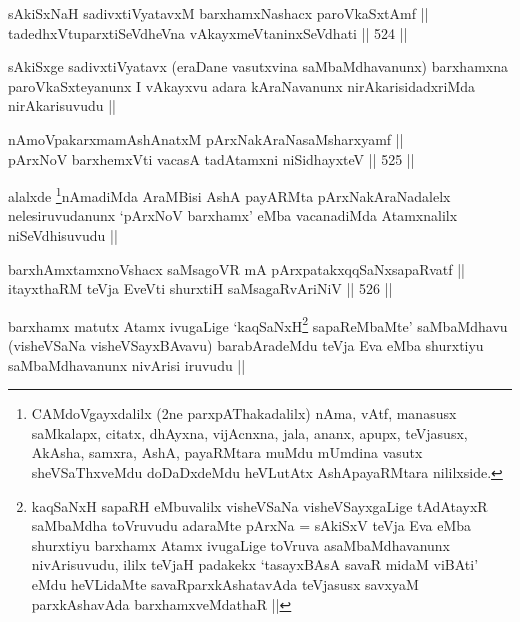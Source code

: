 
\begin{shl}
sAkiSxNaH sadivxtiVyatavxM barxhamxNashacx paroVkaSxtAmf || \\
tadedhxVtuparxtiSeVdheVna vAkayxmeVtaninxSeVdhati ||  524 ||  
\end{shl}

\begin{artha}
sAkiSxge sadivxtiVyatavx (eraDane vasutxvina saMbaMdhavanunx)
barxhamxna paroVkaSxteyanunx I vAkayxvu adara kAraNavanunx
nirAkarisidadxriMda nirAkarisuvudu ||
\end{artha}

\begin{shl}
nAmoVpakarxmamAshAnatxM pArxNakAraNasaMsharxyamf || \\
pArxNoV barxhemxVti vacasA tadAtamxni niSidhayxteV ||  525 ||  
\end{shl}

\begin{artha}
alalxde \footnote{CAMdoVgayxdalilx (2ne parxpAThakadalilx) nAma, vAtf,
  manasusx saMkalapx, citatx, dhAyxna, vijAcnxna, jala, ananx, apupx,
  teVjasusx, AkAsha, samxra, AshA, payaRMtara muMdu mUmdina vasutx
  sheVSaThxveMdu doDaDxdeMdu heVLutAtx AshApayaRMtara nililxside.}nAmadiMda AraMBisi AshA payARMta pArxNakAraNadalelx
nelesiruvudanunx `pArxNoV barxhamx' eMba vacanadiMda Atamxnalilx
niSeVdhisuvudu ||
\end{artha}


\begin{shl}
barxhAmxtamxnoVshacx saMsagoVR mA pArxpatakxqqSaNxsapaRvatf || \\
itayxthaRM teVja EveVti shurxtiH saMsagaRvAriNiV ||  526 ||  
\end{shl}

\begin{artha}
barxhamx matutx Atamx ivugaLige `kaqSaNxH\footnote{kaqSaNxH sapaRH
  eMbuvalilx visheVSaNa visheVSayxgaLige tAdAtayxR saMbaMdha toVruvudu
adaraMte pArxNa = sAkiSxV teVja Eva eMba shurxtiyu barxhamx Atamx
ivugaLige toVruva asaMbaMdhavanunx nivArisuvudu, ililx teVjaH padakekx
`tasayxBAsA savaR midaM viBAti' eMdu heVLidaMte savaRparxkAshatavAda
teVjasusx savxyaM parxkAshavAda barxhamxveMdathaR ||} sapaReMbaMte'
saMbaMdhavu (visheVSaNa visheVSayxBAvavu) barabAradeMdu teVja Eva eMba
shurxtiyu saMbaMdhavanunx nivArisi iruvudu ||
\end{artha}

